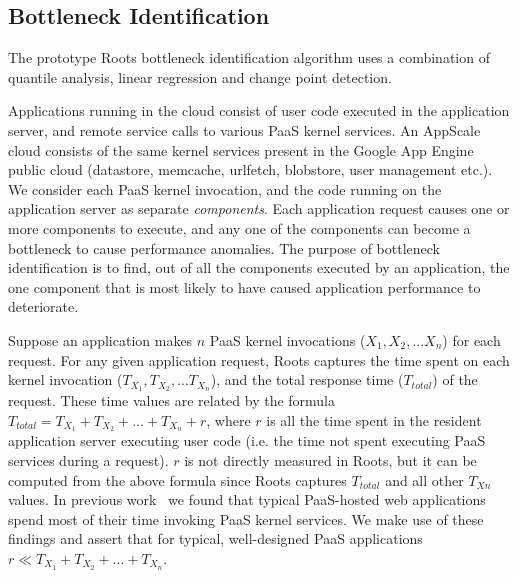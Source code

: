 \subsection{Bottleneck Identification}

The prototype Roots bottleneck identification algorithm uses a combination
of quantile analysis, linear regression and change point detection. 

Applications running in the cloud consist of user code executed in the application server, 
and remote service calls to various PaaS kernel services. An AppScale cloud
consists of the same kernel services present in the Google App Engine public cloud (datastore, memcache,
urlfetch, blobstore, user management etc.).
We consider each PaaS kernel invocation, and the code running on the application server as 
separate \textit{components}. Each application request causes one or more components to
execute, and any one of the components can become a bottleneck to cause performance anomalies.  
The purpose of bottleneck identification is to find, out of all
the components executed by an application, the one component that is most likely to have caused 
application performance to deteriorate.

Suppose an application makes $n$ PaaS kernel invocations ($X_1, X_2, ... X_n$) for each request. 
For any given application request,
Roots captures the time spent on each kernel invocation ($T_{X_1}, T_{X_2}, ... T_{X_n}$), and the 
total response time ($T_{total}$) of the request. These time values are related by the formula
$T_{total} = T_{X_1} + T_{X_2} + ... + T_{X_n} + r$, where $r$ is all the time spent in the resident 
application server executing user code (i.e. the time not
spent executing PaaS services during a request). $r$ is not
directly measured in Roots, but it can be computed from the above formula 
since Roots captures $T_{total}$ and all other $T_{Xn}$ values. In previous
work~\cite{Jayathilaka:2015:RTS:2806777.2806842} we found that typical
PaaS-hosted web applications spend most of their time invoking PaaS kernel services.
We make use of these findings and assert that for typical,
well-designed PaaS applications $r \ll T_{X_1} + T_{X_2} + ... + T_{X_n}$.

